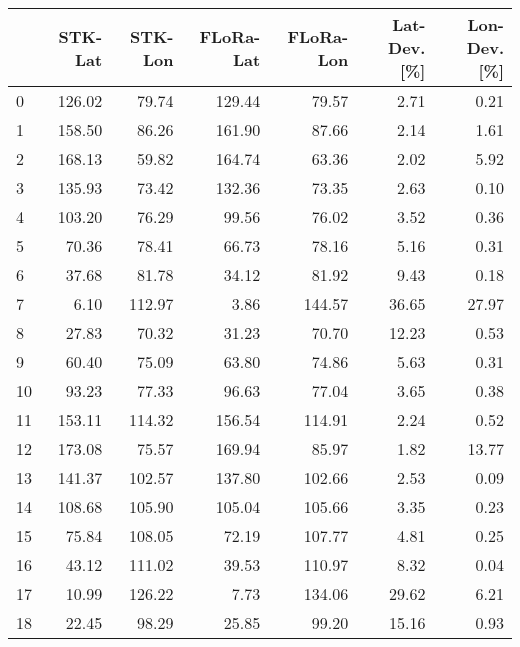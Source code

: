 \begin{tabular}{lrrrrrr}
\toprule
{} &  STK-Lat &  STK-Lon &  FLoRa-Lat &  FLoRa-Lon &  Lat-Dev. [\%] &  Lon-Dev. [\%] \\
\midrule
0  &   126.02 &    79.74 &     129.44 &      79.57 &          2.71 &          0.21 \\
1  &   158.50 &    86.26 &     161.90 &      87.66 &          2.14 &          1.61 \\
2  &   168.13 &    59.82 &     164.74 &      63.36 &          2.02 &          5.92 \\
3  &   135.93 &    73.42 &     132.36 &      73.35 &          2.63 &          0.10 \\
4  &   103.20 &    76.29 &      99.56 &      76.02 &          3.52 &          0.36 \\
5  &    70.36 &    78.41 &      66.73 &      78.16 &          5.16 &          0.31 \\
6  &    37.68 &    81.78 &      34.12 &      81.92 &          9.43 &          0.18 \\
7  &     6.10 &   112.97 &       3.86 &     144.57 &         36.65 &         27.97 \\
8  &    27.83 &    70.32 &      31.23 &      70.70 &         12.23 &          0.53 \\
9  &    60.40 &    75.09 &      63.80 &      74.86 &          5.63 &          0.31 \\
10 &    93.23 &    77.33 &      96.63 &      77.04 &          3.65 &          0.38 \\
11 &   153.11 &   114.32 &     156.54 &     114.91 &          2.24 &          0.52 \\
12 &   173.08 &    75.57 &     169.94 &      85.97 &          1.82 &         13.77 \\
13 &   141.37 &   102.57 &     137.80 &     102.66 &          2.53 &          0.09 \\
14 &   108.68 &   105.90 &     105.04 &     105.66 &          3.35 &          0.23 \\
15 &    75.84 &   108.05 &      72.19 &     107.77 &          4.81 &          0.25 \\
16 &    43.12 &   111.02 &      39.53 &     110.97 &          8.32 &          0.04 \\
17 &    10.99 &   126.22 &       7.73 &     134.06 &         29.62 &          6.21 \\
18 &    22.45 &    98.29 &      25.85 &      99.20 &         15.16 &          0.93 \\

\end{tabular}
